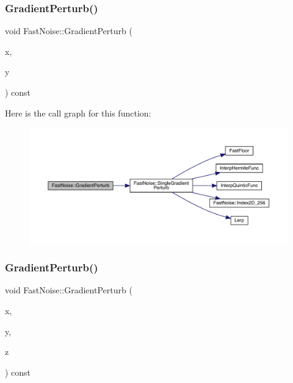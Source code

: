 \subsubsection{\texorpdfstring{Gradient\+Perturb()}{GradientPerturb()}\hspace{0.1cm}{\footnotesize\ttfamily [1/2]}}
{\footnotesize\ttfamily void Fast\+Noise\+::\+Gradient\+Perturb (\begin{DoxyParamCaption}\item[{\mbox{\hyperlink{_fast_noise_8h_a75a9ef6d2541c4921815b885bfd449c3}{F\+N\+\_\+\+D\+E\+C\+I\+M\+AL}} \&}]{x,  }\item[{\mbox{\hyperlink{_fast_noise_8h_a75a9ef6d2541c4921815b885bfd449c3}{F\+N\+\_\+\+D\+E\+C\+I\+M\+AL}} \&}]{y }\end{DoxyParamCaption}) const}

Here is the call graph for this function\+:
\nopagebreak
\begin{figure}[H]
\begin{center}
\leavevmode
\includegraphics[width=350pt]{d1/dd8/class_fast_noise_a84d51e4e3c6abb7897954a4e77194e03_cgraph}
\end{center}
\end{figure}
\mbox{\label{class_fast_noise_a24007877680a6d0f45ea1d7f209ee6f1}} 
\subsubsection{\texorpdfstring{Gradient\+Perturb()}{GradientPerturb()}\hspace{0.1cm}{\footnotesize\ttfamily [2/2]}}
{\footnotesize\ttfamily void Fast\+Noise\+::\+Gradient\+Perturb (\begin{DoxyParamCaption}\item[{\mbox{\hyperlink{_fast_noise_8h_a75a9ef6d2541c4921815b885bfd449c3}{F\+N\+\_\+\+D\+E\+C\+I\+M\+AL}} \&}]{x,  }\item[{\mbox{\hyperlink{_fast_noise_8h_a75a9ef6d2541c4921815b885bfd449c3}{F\+N\+\_\+\+D\+E\+C\+I\+M\+AL}} \&}]{y,  }\item[{\mbox{\hyperlink{_fast_noise_8h_a75a9ef6d2541c4921815b885bfd449c3}{F\+N\+\_\+\+D\+E\+C\+I\+M\+AL}} \&}]{z }\end{DoxyParamCaption}) const}


